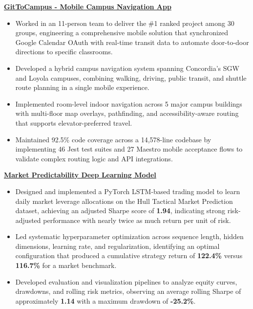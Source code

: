 \documentclass[10pt]{article}
\begin{document}
\href{https://github.com/LamdaDev/GitToCampus}{\textbf{GitToCampus - Mobile Campus Navigation App}}
\vspace{-4mm}
\begin{itemize}[left=0.15in, itemsep=0pt, label=--]
    \item Worked in an 11-person team to deliver the \#1 ranked project among 30 groups, engineering a comprehensive mobile solution that synchronized Google Calendar OAuth with real-time transit data to automate door-to-door directions to specific classrooms.
    \item Developed a hybrid campus navigation system spanning Concordia’s SGW and Loyola campuses, combining walking, driving, public transit, and shuttle route planning in a single mobile experience.
    \item Implemented room-level indoor navigation across 5 major campus buildings with multi-floor map overlays, pathfinding, and accessibility-aware routing that supports elevator-preferred travel.
    \item Maintained 92.5\% code coverage across a 14,578-line codebase by implementing 46 Jest test suites and 27 Maestro mobile acceptance flows to validate complex routing logic and API integrations.
\end{itemize}

\href{https://github.com/Extinctable/COMP-433}{\textbf{Market Predictability Deep Learning Model}}
\vspace{-4mm}
\begin{itemize}[left=0.15in, itemsep=0pt, label=--]
    \item Designed and implemented a PyTorch LSTM-based trading model to learn daily market leverage allocations on the Hull Tactical Market Prediction dataset, achieving an adjusted Sharpe score of \textbf{1.94}, indicating strong risk-adjusted performance with nearly twice as much return per unit of risk.
    \item Led systematic hyperparameter optimization across sequence length, hidden dimensions, learning rate, and regularization, identifying an optimal configuration that produced a cumulative strategy return of \textbf{122.4\%} versus \textbf{116.7\%} for a market benchmark.
    \item Developed evaluation and visualization pipelines to analyze equity curves, drawdowns, and rolling risk metrics, observing an average rolling Sharpe of approximately \textbf{1.14} with a maximum drawdown of \textbf{-25.2\%}.
\end{itemize}
\end{document}
